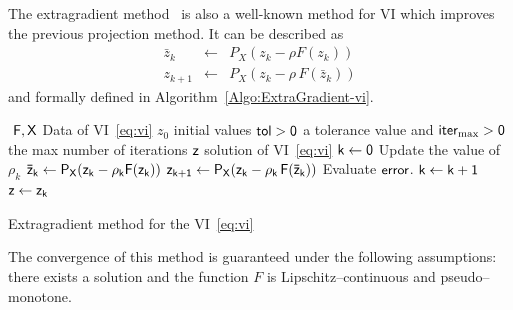 {The extragradient method~\citep{Korpelevich1976} is also a well-known method for VI which improves the previous projection method.  It can be described as
\begin{equation}
  \label{eq:vi-ge5}
  \begin{array}{lcl}
    \bar z_{k} &\leftarrow& P_X(z_k-\rho F(z_k))\\
    z_{k+1} &\leftarrow& P_X(z_{k}-\rho\,F(\bar z_k))
  \end{array}
\end{equation}
and {formally defined} in Algorithm~\ref{Algo:ExtraGradient-vi}.
\begin{algorithm}
  \begin{algorithmic}
    {\sf
      \STATE $ $
      \REQUIRE $\sf F,X$ Data of VI~\eqref{eq:vi}
      \REQUIRE $z_0$ initial values
      \REQUIRE $\sf tol >0$ a tolerance value and $\sf iter_{\max}  >0$ the max number of iterations
      \ENSURE  $\sf z$ solution of VI~\eqref{eq:vi}
      \STATE   $\sf k \leftarrow 0$ 
      \STATE Update the value of $\rho_k$
      \STATE $\sf \bar z_{k} \leftarrow P_X(z_{k}-\rho_k F(z_k))$
      \STATE $\sf z_{k+1} \leftarrow P_X(z_{k}-\rho_k\,F(\bar z_k))$
      \STATE Evaluate $\sf error$.
      \STATE $\sf k \leftarrow k+1$
      \ENDWHILE
      \STATE $\sf z \leftarrow z_{k}$ 
    }
  \end{algorithmic}
  \caption{Extragradient method for the VI~\eqref{eq:vi}}  \label{Algo:ExtraGradient-vi}
\end{algorithm}
The convergence of this method {is guaranteed under the following assumptions:} there exists a solution and the function $F$ is Lipschitz--continuous and pseudo--monotone.


}
